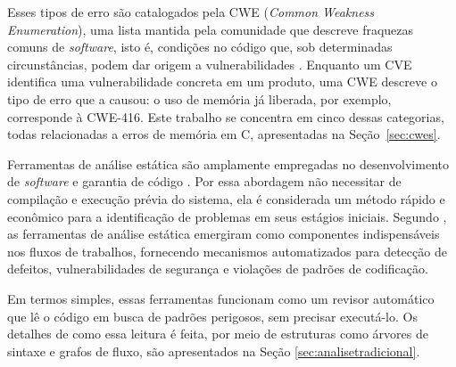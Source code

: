 \documentclass[
    12pt,                %
    openright,           %
    oneside,             %
    a4paper,             %
    english,             %
    brazil               %
]{abntex2}
\begin{document}
\par
Esses tipos de erro são catalogados pela CWE (\textit{Common Weakness Enumeration}), uma lista mantida pela comunidade que descreve fraquezas comuns de \textit{software}, isto é, condições no código que, sob determinadas circunstâncias, podem dar origem a vulnerabilidades \cite{mitrecwe}.
Enquanto um CVE identifica uma vulnerabilidade concreta em um produto, uma CWE descreve o tipo de erro que a causou: o uso de memória já liberada, por exemplo, corresponde à CWE-416.
Este trabalho se concentra em cinco dessas categorias, todas relacionadas a erros de memória em C, apresentadas na Seção~\ref{sec:cwes}.
\par
Ferramentas de análise estática são amplamente empregadas no desenvolvimento de \textit{software} e garantia de código \cite{hou2025generation}.
Por essa abordagem não necessitar de compilação e execução prévia do sistema, ela é considerada um método rápido e econômico para a identificação de problemas em seus estágios iniciais.
Segundo , as ferramentas de análise estática emergiram como componentes indispensáveis nos fluxos de trabalhos, fornecendo mecanismos automatizados para detecção de defeitos, vulnerabilidades de segurança e violações de padrões de codificação.
\par
Em termos simples, essas ferramentas funcionam como um revisor automático que lê o código em busca de padrões perigosos, sem precisar executá-lo.
Os detalhes de como essa leitura é feita, por meio de estruturas como árvores de sintaxe e grafos de fluxo, são apresentados na Seção \ref{sec:analisetradicional}.
\end{document}
